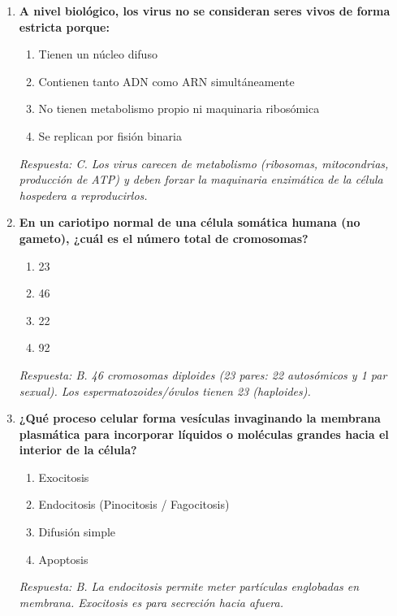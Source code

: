 \begin{enumerate}[label=\textbf{\arabic*.}]
    \item \textbf{A nivel biológico, los virus no se consideran seres vivos de forma estricta porque:}
    \begin{enumerate}
        \item[A)] Tienen un núcleo difuso
        \item[B)] Contienen tanto ADN como ARN simultáneamente
        \item[C)] No tienen metabolismo propio ni maquinaria ribosómica
        \item[D)] Se replican por fisión binaria
    \end{enumerate}
    \textit{Respuesta: C. Los virus carecen de metabolismo (ribosomas, mitocondrias, producción de ATP) y deben forzar la maquinaria enzimática de la célula hospedera a reproducirlos.}

    \item \textbf{En un cariotipo normal de una célula somática humana (no gameto), ¿cuál es el número total de cromosomas?}
    \begin{enumerate}
        \item[A)] 23
        \item[B)] 46
        \item[C)] 22
        \item[D)] 92
    \end{enumerate}
    \textit{Respuesta: B. 46 cromosomas diploides (23 pares: 22 autosómicos y 1 par sexual). Los espermatozoides/óvulos tienen 23 (haploides).}

    \item \textbf{¿Qué proceso celular forma vesículas invaginando la membrana plasmática para incorporar líquidos o moléculas grandes hacia el interior de la célula?}
    \begin{enumerate}
        \item[A)] Exocitosis
        \item[B)] Endocitosis (Pinocitosis / Fagocitosis)
        \item[C)] Difusión simple
        \item[D)] Apoptosis
    \end{enumerate}
    \textit{Respuesta: B. La endocitosis permite meter partículas englobadas en membrana. Exocitosis es para secreción hacia afuera.}


\end{enumerate}
